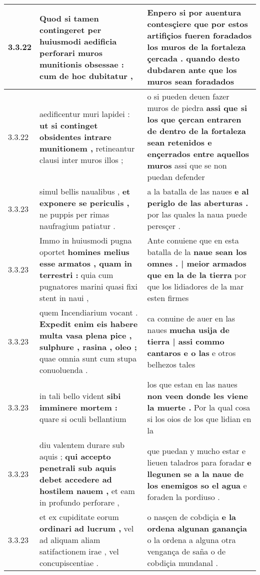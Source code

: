 \begin{tabular}{|p{1cm}|p{6.5cm}|p{6.5cm}|}
3.3.22 & Quod si tamen contingeret \textbf{ per huiusmodi aedificia perforari muros munitionis obsessae : } cum de hoc dubitatur , & Enpero si por auentura contesçiere \textbf{ que por estos artifiçios fueren foradados los muros de la fortaleza çercada . } quando desto dubdaren ante que los muros sean foradados \\\hline
3.3.22 & aedificentur muri lapidei : \textbf{ ut si continget obsidentes intrare munitionem , } retineantur clausi inter muros illos ; & o si pueden deuen fazer muros de piedra \textbf{ assi que si los que çercan entraren de dentro de la fortaleza sean retenidos e ençerrados entre aquellos muros } assi que se non puedan defender \\\hline
3.3.23 & simul bellis naualibus , \textbf{ et exponere se periculis , } ne puppis per rimas naufragium patiatur . & a la batalla de las naues \textbf{ e al periglo de las aberturas . } por las quales la naua puede peresçer . \\\hline
3.3.23 & Immo in huiusmodi pugna oportet \textbf{ homines melius esse armatos , quam in terrestri : } quia cum pugnatores marini quasi fixi stent in naui , & Ante conuiene que en esta batalla de la \textbf{ naue sean los omnes . | meior armados que en la de la tierra } por que los lidiadores de la mar esten firmes \\\hline
3.3.23 & quem Incendiarium vocant . \textbf{ Expedit enim eis habere multa vasa plena pice , sulphure , rasina , oleo ; } quae omnia sunt cum stupa conuoluenda . & ca conuine de auer en las naues \textbf{ mucha usija de tierra | assi commo cantaros e o las } e otros belhezos tales \\\hline
3.3.23 & in tali bello vident \textbf{ sibi imminere mortem : } quare si oculi bellantium & los que estan en las naues \textbf{ non veen donde les viene la muerte . } Por la qual cosa si los oios de los que lidian en la \\\hline
3.3.23 & diu valentem durare sub aquis ; \textbf{ qui accepto penetrali sub aquis debet accedere ad hostilem nauem , } et eam in profundo perforare , & que puedan y mucho estar e lieuen taladros para foradar \textbf{ e llegunen se a la naue de los enemigos so el agua } e foraden la pordiuso . \\\hline
3.3.23 & et ex cupiditate eorum \textbf{ ordinari ad lucrum , } vel ad aliquam aliam satifactionem irae , vel concupiscentiae . & o nasçen de cobdiçia \textbf{ e la ordena algunan ganançia } o la ordena a alguna otra vengança de saña o de cobdiçia mundanal . \\\hline

\end{tabular}
